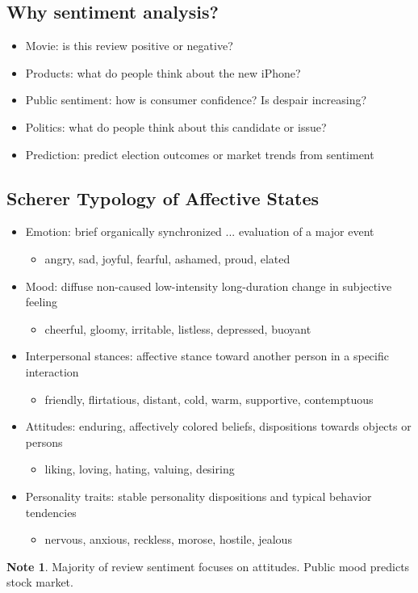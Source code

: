 \documentclass[11pt]{article}
\theoremstyle{definition}
\newtheorem{note}{Note}
\begin{document}
\subsection{Why sentiment analysis?}
\begin{itemize}
  \item Movie: is this review positive or negative?
  \item Products: what do people think about the new iPhone?
  \item Public sentiment: how is consumer confidence? Is despair
  increasing?
  \item Politics: what do people think about this candidate or issue?
  \item Prediction: predict election outcomes or market trends from
  sentiment
\end{itemize}

\subsection{Scherer Typology of Affective States}
\begin{itemize}
  \item Emotion: brief organically synchronized ... evaluation of a major event
  \begin{itemize}
  \item angry, sad, joyful, fearful, ashamed, proud, elated
  \end{itemize}
  \item Mood: diffuse non-caused low-intensity long-duration change in subjective feeling
  \begin{itemize}
    \item cheerful, gloomy, irritable, listless, depressed, buoyant
  \end{itemize}
  \item Interpersonal stances: affective stance toward another person in a specific interaction
  \begin{itemize}
    \item friendly, flirtatious, distant, cold, warm, supportive, contemptuous
  \end{itemize}
  \item Attitudes: enduring, affectively colored beliefs, dispositions towards objects or persons
  \begin{itemize}
    \item liking, loving, hating, valuing, desiring
  \end{itemize}
  \item Personality traits: stable personality dispositions and typical behavior tendencies
  \begin{itemize}
    \item nervous, anxious, reckless, morose, hostile, jealous
  \end{itemize}
\end{itemize}
\begin{note}
  Majority of review sentiment focuses on attitudes. Public mood predicts stock market.
\end{note}
\end{document}
